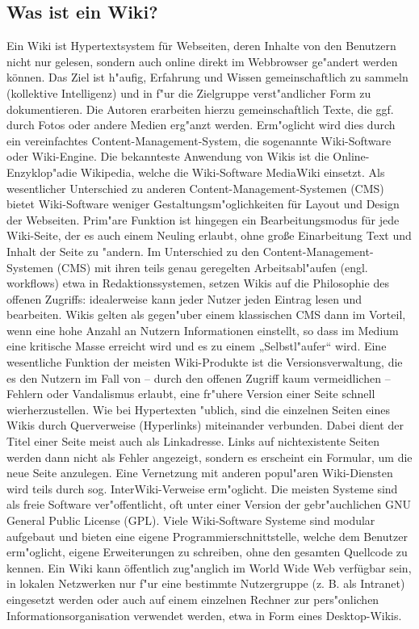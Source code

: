 \subsection{Was ist ein Wiki?}
Ein Wiki ist Hypertextsystem für Webseiten, deren Inhalte von den Benutzern nicht nur gelesen, sondern auch online direkt im Webbrowser ge"andert werden können. Das Ziel ist h"aufig, Erfahrung und Wissen gemeinschaftlich zu sammeln (kollektive Intelligenz) und in f"ur die Zielgruppe verst"andlicher Form zu dokumentieren. Die Autoren erarbeiten hierzu gemeinschaftlich Texte, die ggf. durch Fotos oder andere Medien erg"anzt werden. Erm"oglicht wird dies durch ein vereinfachtes Content-Management-System, die sogenannte Wiki-Software oder Wiki-Engine. Die bekannteste Anwendung von Wikis ist die Online-Enzyklop"adie Wikipedia, welche die Wiki-Software MediaWiki einsetzt. Als wesentlicher Unterschied zu anderen Content-Management-Systemen (CMS) bietet Wiki-Software weniger Gestaltungsm"oglichkeiten für Layout und Design der Webseiten. Prim"are Funktion ist hingegen ein Bearbeitungsmodus für jede Wiki-Seite, der es auch einem Neuling erlaubt, ohne große Einarbeitung Text und Inhalt der Seite zu "andern. Im Unterschied zu den Content-Management-Systemen (CMS) mit ihren teils genau geregelten Arbeitsabl"aufen (engl. workflows) etwa in Redaktionssystemen, setzen Wikis auf die Philosophie des offenen Zugriffs: idealerweise kann jeder Nutzer jeden Eintrag lesen und bearbeiten. Wikis gelten als gegen"uber einem klassischen CMS dann im Vorteil, wenn eine hohe Anzahl an Nutzern Informationen einstellt, so dass im Medium eine kritische Masse erreicht wird und es zu einem „Selbstl"aufer“ wird. Eine wesentliche Funktion der meisten Wiki-Produkte ist die Versionsverwaltung, die es den Nutzern im Fall von – durch den offenen Zugriff kaum vermeidlichen – Fehlern oder Vandalismus erlaubt, eine fr"uhere Version einer Seite schnell wierherzustellen. Wie bei Hypertexten "ublich, sind die einzelnen Seiten eines Wikis durch Querverweise (Hyperlinks) miteinander verbunden. Dabei dient der Titel einer Seite meist auch als Linkadresse. Links auf nichtexistente Seiten werden dann nicht als Fehler angezeigt, sondern es erscheint ein Formular, um die neue Seite anzulegen. Eine Vernetzung mit anderen popul"aren Wiki-Diensten wird teils durch sog. InterWiki-Verweise erm"oglicht. Die meisten Systeme sind als freie Software ver"offentlicht, oft unter einer Version der gebr"auchlichen GNU General Public License (GPL). Viele Wiki-Software Systeme sind modular aufgebaut und bieten eine eigene Programmierschnittstelle, welche dem Benutzer erm"oglicht, eigene Erweiterungen zu schreiben, ohne den gesamten Quellcode zu kennen. Ein Wiki kann öffentlich zug"anglich im World Wide Web verfügbar sein, in lokalen Netzwerken nur f"ur eine bestimmte Nutzergruppe (z. B. als Intranet) eingesetzt werden oder auch auf einem einzelnen Rechner zur pers"onlichen Informationsorganisation verwendet werden, etwa in Form eines Desktop-Wikis. 
